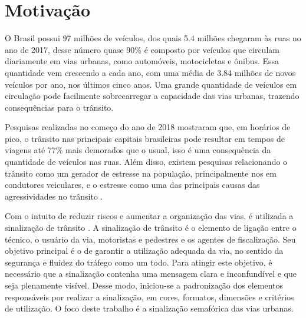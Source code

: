 \section{Motivação}

O Brasil possui 97 milhões de veículos, dos quais 5.4 milhões chegaram às ruas no ano de 2017, desse número quase 90\% é composto por veículos que circulam diariamente em vias urbanas, como automóveis, motocicletas e ônibus. Essa quantidade vem crescendo a cada ano, com uma média de 3.84 milhões de novos veículos por ano, nos últimos cinco anos. %
Uma grande quantidade de veículos em circulação pode facilmente sobrecarregar a capacidade das vias urbanas, trazendo consequências para o trânsito.

Pesquisas realizadas no começo do ano de 2018 mostraram que, em horários de pico, o trânsito nas principais capitais brasileiras pode resultar em tempos de viagens até 77\% mais demorados que o usual\cite{recife}, %
isso é uma consequência da quantidade de veículos nas ruas. Além disso, existem pesquisas relacionando o trânsito como um gerador de estresse na população, principalmente nos em condutores veiculares, e o estresse como uma das principais causas das agressividades no trânsito \cite{stress}\cite{stress2}\cite{stress3}.  %

Com o intuito de reduzir riscos e aumentar a organização das vias, é utilizada a sinalização de trânsito \cite{nota_tecnica}. A sinalização de trânsito é o elemento de ligação entre o técnico, o usuário da via, motoristas e pedestres e os agentes de fiscalização. Seu objetivo principal é o de garantir a utilização adequada da via, no sentido da segurança e fluidez do tráfego como um todo. Para atingir este objetivo, é necessário que a sinalização contenha uma mensagem clara e inconfundível e que seja plenamente visível. Desse modo, iniciou-se a padronização dos elementos responsáveis por realizar a sinalização, em cores, formatos, dimensões e critérios de utilização\cite{CET}. %
O foco deste trabalho é a sinalização semafórica das vias urbanas.

